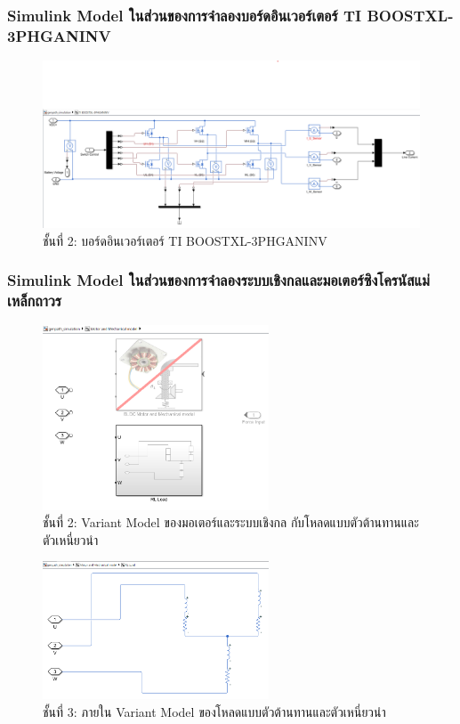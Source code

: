 \documentclass[11pt,a4paper]{article}
\begin{document}
\subsubsection{Simulink Model ในส่วนของการจำลองบอร์ดอินเวอร์เตอร์ TI BOOSTXL-3PHGANINV}

\begin{figure}[H]
    \centering
    \includegraphics[width=\textwidth]{l1-inverter.png}
    \caption{ชั้นที่ 2: บอร์ดอินเวอร์เตอร์ TI BOOSTXL-3PHGANINV}
\end{figure}

\subsubsection{Simulink Model ในส่วนของการจำลองระบบเชิงกลและมอเตอร์ซิงโครนัสแม่เหล็กถาวร}

\begin{figure}[H]
    \centering
    \includegraphics[width=0.6\textwidth]{l1-mechmodel.png}
    \caption{ชั้นที่ 2: Variant Model ของมอเตอร์และระบบเชิงกล กับโหลดแบบตัวต้านทานและตัวเหนี่ยวนำ}
\end{figure}

\begin{figure}[H]
    \centering
    \includegraphics[width=0.6\textwidth]{l2-rlload.png}
    \caption{ชั้นที่ 3: ภายใน Variant Model ของโหลดแบบตัวต้านทานและตัวเหนี่ยวนำ}
\end{figure}
\end{document}
